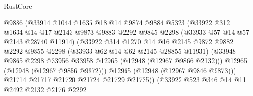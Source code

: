 \begin{lexlean}{RustCore}
\begin{coremodule}
                                @9886
                                (@33914
                                  @1044
                                  @1635
                                  @18
                                  @14
                                  @9874
                                  @9884
                                  @5323
                                  (@33922
                                    @312
                                    @1634
                                    @14
                                    @17
                                    @2143
                                    @9873
                                    @9883
                                    @2292
                                    @9845
                                    @2298
                                    (@33933 @57 @14 @57 @2143 @28740 @11914)
                                    (@33922
                                      @314
                                      @1270
                                      @14
                                      @16
                                      @2145
                                      @9872
                                      @9882
                                      @2292
                                      @9855
                                      @2298
                                      (@33933 @62 @14 @62 @2145 @28855 @11931)
                                      (@33948
                                        @9865
                                        @2298
                                        @33956
                                        @33958
                                        @12965
                                        (@12948 (@12967 @9866 @2132)))
                                      @12965
                                      (@12948 (@12967 @9856 @9872)))
                                    @12965
                                    (@12948 (@12967 @9846 @9873)))
                                  @21714
                                  @21717
                                  @21720
                                  @21724
                                  @21729
                                  @21735))
                              (@33922
                                @523
                                @346
                                @14
                                @11
                                @2492
                                @2132
                                @2176
                                @2292

\end{coremodule}
\end{lexlean}
